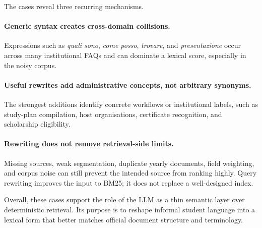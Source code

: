 The cases reveal three recurring mechanisms.

\paragraph{Generic syntax creates cross-domain collisions.} Expressions such as \emph{quali sono}, \emph{come posso}, \emph{trovare}, and \emph{presentazione} occur across many institutional FAQs and can dominate a lexical score, especially in the noisy corpus.

\paragraph{Useful rewrites add administrative concepts, not arbitrary synonyms.} The strongest additions identify concrete workflows or institutional labels, such as study-plan compilation, host organisations, certificate recognition, and scholarship eligibility.

\paragraph{Rewriting does not remove retrieval-side limits.} Missing sources, weak segmentation, duplicate yearly documents, field weighting, and corpus noise can still prevent the intended source from ranking highly. Query rewriting improves the input to BM25; it does not replace a well-designed index.

Overall, these cases support the role of the LLM as a thin semantic layer over deterministic retrieval. Its purpose is to reshape informal student language into a lexical form that better matches official document structure and terminology.
